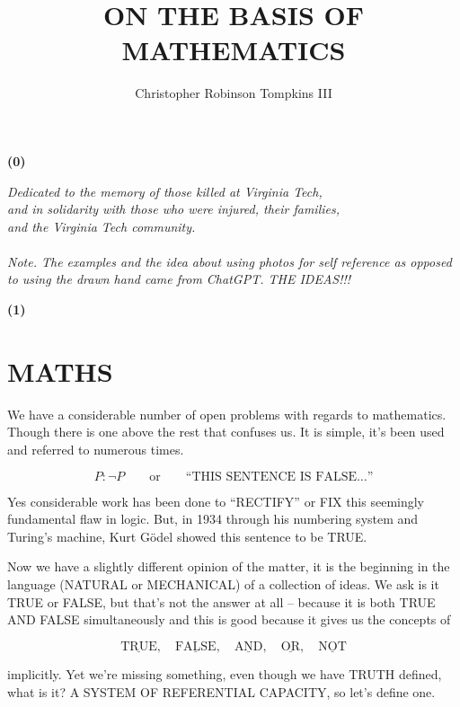 \documentclass[12pt]{article}
\title{\textbf{ON THE BASIS OF MATHEMATICS}}
\author{Christopher Robinson Tompkins III}
\date{}
\begin{document}
    \maketitle
    \textbf{(0)}
    \begin{center}
        \emph{Dedicated to the memory of those killed at Virginia Tech,\\
        and in solidarity with those who were injured, their families,\\
        and the Virginia Tech community.}
        \qquad\\
        \qquad\\
        \emph{Note. The examples and the idea about using photos for self reference as opposed to using the drawn
        hand came from ChatGPT. THE IDEAS!!!}
    \end{center}

    \textbf{(1)}
    \section*{MATHS}

    We have a considerable number of open problems with regards to mathematics.
    Though there is one above the rest that confuses us. It is simple, it's been
    used and referred to numerous times.

    \[
        P:\neg P
        \qquad\text{or}\qquad
        \text{``THIS SENTENCE IS FALSE\ldots''}
    \]

    Yes considerable work has been done to ``RECTIFY'' or FIX this seemingly
    fundamental flaw in logic. But, in 1934 through his numbering system and
    Turing's machine, Kurt G\"odel showed this sentence to be TRUE.

    Now we have a slightly different opinion of the matter, it is the beginning in
    the language (NATURAL or MECHANICAL) of a collection of ideas. We ask is it
    TRUE or FALSE, but that's not the answer at all -- because it is both TRUE AND
    FALSE simultaneously and this is good because it gives us the concepts of

    \[
        \underline{\text{TRUE}},\quad
        \underline{\text{FALSE}},\quad
        \underline{\text{AND}},\quad
        \underline{\text{OR}},\quad
        \underline{\text{NOT}}
    \]

    implicitly. Yet we're missing something, even though we have TRUTH defined,
    what is it? A SYSTEM OF REFERENTIAL CAPACITY, so let's define one.

    \newpage
\end{document}
